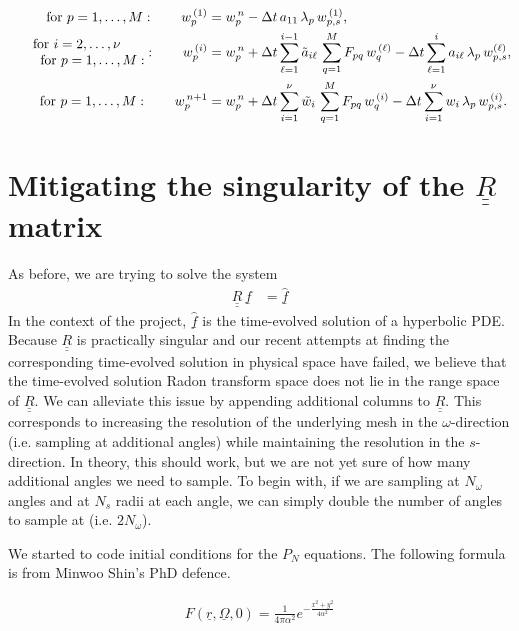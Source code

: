 \documentclass[12pt]{article}
\newcommand{\bunderline}[1]{\underline{#1}}
\renewcommand{\vec}[1]{{\bunderline{#1}}}
\newcommand{\mat}[1]{{\bunderline{\bunderline{#1}}}}
\begin{document}
\begin{align}
        \text{for $p=1,\ldots,M$}: \qquad w^{ \, (1)}_p &= w^{ \, n}_p - {\Delta t} \, a_{11} \, \lambda_p \, w^{ \, (1)}_{p,s}, \\
       \begin{matrix} \text{for $i=2,\ldots,\nu$} \\ \text{ \quad \quad for $p=1,\ldots,M$}: \end{matrix} : \qquad w^{ \, (i)}_p &= w^{ \, n}_p + \Delta t \sum_{\ell = 1}^{i-1} \tilde{a}_{i\ell} \, \sum_{q=1}^M F_{pq} \, w^{ \, (\ell)}_q - {\Delta t} \sum_{\ell=1}^{i} a_{i\ell} \, \lambda_p \, w^{(\ell)}_{p,s}, \\
        \text{for $p=1,\ldots,M$}: \qquad  w_p^{ \, n+1} &= w^{ \, n}_p + \Delta t \sum_{i=1}^{\nu} \tilde{w}_i \, \sum_{q=1}^M F_{pq} \, w^{ \, (i)}_q - {\Delta t} \sum_{i = 1}^{\nu} w_i \, \lambda_p \, w^{ \, (i)}_{p,s}.
\end{align}

\section*{Mitigating the singularity of the $\mat{R}$ matrix}
As before, we are trying to solve the system
\begin{align*}
	\mat{R} \, \vec{f} & = \vec{\hat{f}}
\end{align*}
In the context of the project, $\vec{\hat{f}}$ is the time-evolved solution of a hyperbolic PDE.
Because $\mat{R}$ is practically singular and our recent attempts at finding the corresponding time-evolved solution in physical space have failed, we believe that the time-evolved solution Radon transform space does not lie in the range space of $\mat{R}$.
We can alleviate this issue by appending additional columns to $\mat{R}$.
This corresponds to increasing the resolution of the underlying mesh in the $\omega$-direction (i.e. sampling at additional angles) while maintaining the resolution in the $s$-direction. 
In theory, this should work, but we are not yet sure of how many additional angles we need to sample.
To begin with, if we are sampling at $N_{\omega}$ angles and at $N_{s}$ radii at each angle, we can simply double the number of angles to sample at (i.e. $2 N_{\omega}$).

We started to code initial conditions for the $P_N$ equations. The following formula is from Minwoo Shin's PhD defence.

\begin{align*}
F(\vec{r}, \vec{\Omega}, 0) = \frac{1}{4\pi\alpha^2}e^{-\frac{x^2+y^2}{4\alpha^2}}
\end{align*}
\end{document}

